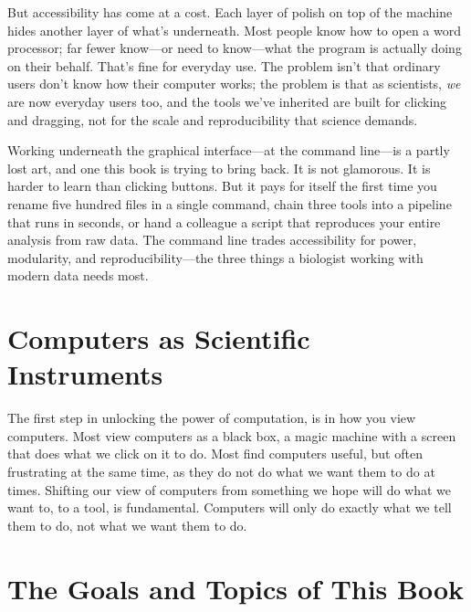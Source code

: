 But accessibility has come at a cost. Each layer of polish on top of the machine hides another layer of what's underneath. Most people know how to open a word processor; far fewer know---or need to know---what the program is actually doing on their behalf. That's fine for everyday use. The problem isn't that ordinary users don't know how their computer works; the problem is that as scientists, \emph{we} are now everyday users too, and the tools we've inherited are built for clicking and dragging, not for the scale and reproducibility that science demands.

Working underneath the graphical interface---at the command line---is a partly lost art, and one this book is trying to bring back. It is not glamorous. It is harder to learn than clicking buttons. But it pays for itself the first time you rename five hundred files in a single command, chain three tools into a pipeline that runs in seconds, or hand a colleague a script that reproduces your entire analysis from raw data. The command line trades accessibility for power, modularity, and reproducibility---the three things a biologist working with modern data needs most.

\section{Computers as Scientific Instruments}

The first step in unlocking the power of computation, is in how you view computers. Most view computers as a black box, a magic machine with a screen that does what we click on it to do. Most find computers useful, but often frustrating at the same time, as they do not do what we want them to do at times. Shifting our view of computers from something we hope will do what we want to, to a tool, is fundamental. Computers will only do exactly what we tell them to do, not what we want them to do.

\section{The Goals and Topics of This Book}
